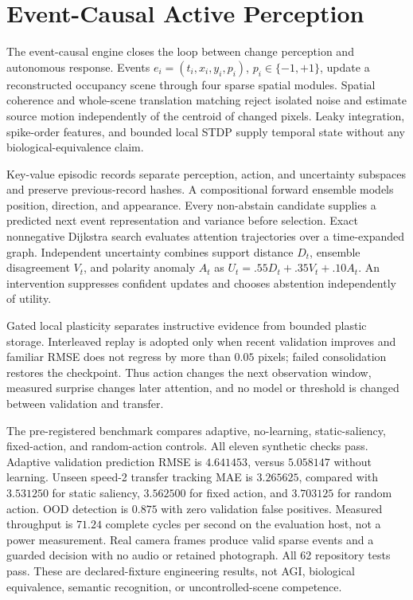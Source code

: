\section{Event-Causal Active Perception}
The event-causal engine closes the loop between change perception and autonomous response. Events $e_i=(t_i,x_i,y_i,p_i)$, $p_i\in\{-1,+1\}$, update a reconstructed occupancy scene through four sparse spatial modules. Spatial coherence and whole-scene translation matching reject isolated noise and estimate source motion independently of the centroid of changed pixels. Leaky integration, spike-order features, and bounded local STDP supply temporal state without any biological-equivalence claim.

Key-value episodic records separate perception, action, and uncertainty subspaces and preserve previous-record hashes. A compositional forward ensemble models position, direction, and appearance. Every non-abstain candidate supplies a predicted next event representation and variance before selection. Exact nonnegative Dijkstra search evaluates attention trajectories over a time-expanded graph. Independent uncertainty combines support distance $D_t$, ensemble disagreement $V_t$, and polarity anomaly $A_t$ as $U_t=.55D_t+.35V_t+.10A_t$. An intervention suppresses confident updates and chooses abstention independently of utility.

Gated local plasticity separates instructive evidence from bounded plastic storage. Interleaved replay is adopted only when recent validation improves and familiar RMSE does not regress by more than $0.05$ pixels; failed consolidation restores the checkpoint. Thus action changes the next observation window, measured surprise changes later attention, and no model or threshold is changed between validation and transfer.

The pre-registered benchmark compares adaptive, no-learning, static-saliency, fixed-action, and random-action controls. All eleven synthetic checks pass. Adaptive validation prediction RMSE is $4.641453$, versus $5.058147$ without learning. Unseen speed-2 transfer tracking MAE is $3.265625$, compared with $3.531250$ for static saliency, $3.562500$ for fixed action, and $3.703125$ for random action. OOD detection is $0.875$ with zero validation false positives. Measured throughput is $71.24$ complete cycles per second on the evaluation host, not a power measurement. Real camera frames produce valid sparse events and a guarded decision with no audio or retained photograph. All 62 repository tests pass. These are declared-fixture engineering results, not AGI, biological equivalence, semantic recognition, or uncontrolled-scene competence.

